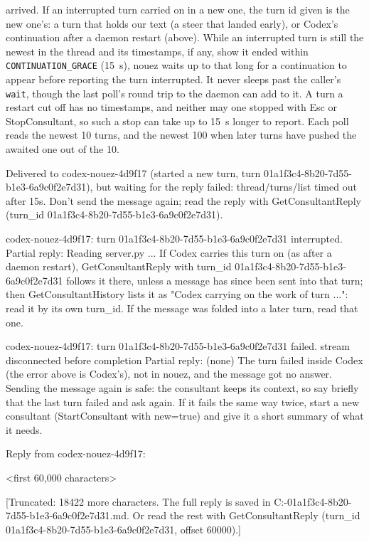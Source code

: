 \documentclass[10pt,a4paper]{article}
\newcommand{\code}[1]{\texttt{#1}}
\begin{document}
arrived. If an interrupted turn carried on in a new one, the turn id given is the new one's: a
turn that holds our text (a steer that landed early), or Codex's continuation after a daemon
restart (above). While an interrupted turn is still the newest in the thread and its timestamps,
if any, show it ended within \code{CONTINUATION\_GRACE} (15~s), nouez waits up to that long for a
continuation to appear before reporting the turn interrupted. It never sleeps past the caller's
\code{wait}, though the last poll's round trip to the daemon can add to it. A turn a restart cut off has no timestamps, and neither may one stopped with Esc or
StopConsultant, so such a stop can take up to 15~s longer to report. Each poll reads the newest 10 turns,
and the newest 100 when later turns have pushed the awaited one out of the 10.
\begin{plain}
Delivered to codex-nouez-4d9f17 (started a new turn, turn 01a1f3c4-8b20-7d55-b1e3-6a9c0f2e7d31), but waiting for the reply failed: thread/turns/list timed out after 15s. Don't send the message again; read the reply with GetConsultantReply (turn_id 01a1f3c4-8b20-7d55-b1e3-6a9c0f2e7d31).
\end{plain}
\begin{plain}
codex-nouez-4d9f17: turn 01a1f3c4-8b20-7d55-b1e3-6a9c0f2e7d31 interrupted.
Partial reply:
Reading server.py ...
If Codex carries this turn on (as after a daemon restart), GetConsultantReply with turn_id 01a1f3c4-8b20-7d55-b1e3-6a9c0f2e7d31 follows it there, unless a message has since been sent into that turn; then GetConsultantHistory lists it as "Codex carrying on the work of turn ...": read it by its own turn_id. If the message was folded into a later turn, read that one.
\end{plain}
\begin{plain}
codex-nouez-4d9f17: turn 01a1f3c4-8b20-7d55-b1e3-6a9c0f2e7d31 failed. stream disconnected before completion
Partial reply:
(none)
The turn failed inside Codex (the error above is Codex's), not in nouez, and the message got no answer. Sending the message again is safe: the consultant keeps its context, so say briefly that the last turn failed and ask again. If it fails the same way twice, start a new consultant (StartConsultant with new=true) and give it a short summary of what it needs.
\end{plain}
\begin{plain}
Reply from codex-nouez-4d9f17:

<first 60,000 characters>

[Truncated: 18422 more characters. The full reply is saved in C:\Users\you\AppData\Local\nouez\replies\reply-01a1f3c4-8b20-7d55-b1e3-6a9c0f2e7d31.md. Or read the rest with GetConsultantReply (turn_id 01a1f3c4-8b20-7d55-b1e3-6a9c0f2e7d31, offset 60000).]
\end{plain}
\end{document}
